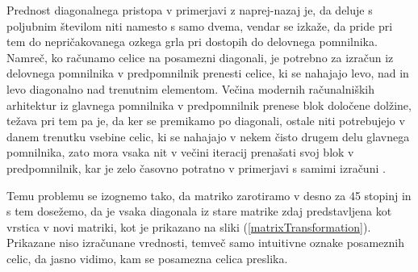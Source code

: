 \documentclass[a4paper,12pt,openright]{book}
\begin{document}
Prednost diagonalnega pristopa v primerjavi z naprej-nazaj je, da deluje s poljubnim številom niti namesto s samo dvema, vendar se izkaže, da pride pri tem do nepričakovanega ozkega grla pri dostopih do delovnega pomnilnika. Namreč, ko računamo celice na posamezni diagonali, je potrebno za izračun iz delovnega pomnilnika v predpomnilnik prenesti celice, ki se nahajajo levo, nad in levo diagonalno nad trenutnim elementom. Večina modernih računalniških arhitektur iz glavnega pomnilnika v predpomnilnik prenese blok določene dolžine, težava pri tem pa je, da ker se premikamo po diagonali, ostale niti potrebujejo v danem trenutku vsebine celic, ki se nahajajo v nekem čisto drugem delu glavnega pomnilnika, zato mora vsaka nit v večini iteracij prenašati svoj blok v predpomnilnik, kar je zelo časovno potratno v primerjavi s samimi izračuni \cite{bottleneck}. 

Temu problemu se izognemo tako, da matriko zarotiramo v desno za 45 stopinj in s tem dosežemo, da je vsaka diagonala iz stare matrike zdaj predstavljena kot vrstica v novi matriki, kot je prikazano na sliki (\ref{matrixTransformation}). Prikazane niso izračunane vrednosti, temveč samo intuitivne oznake posameznih celic, da jasno vidimo, kam se posamezna celica preslika. 
\end{document}
